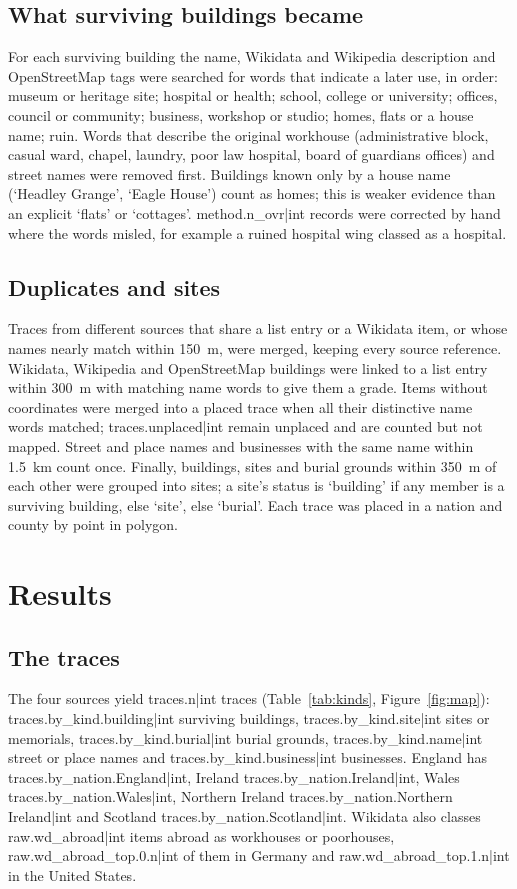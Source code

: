 \documentclass[11pt,a4paper]{article}
\begin{document}
\subsection{What surviving buildings became}
For each surviving building the name, Wikidata and Wikipedia description and OpenStreetMap tags were searched for words that indicate a later use, in order: museum or heritage site; hospital or health; school, college or university; offices, council or community; business, workshop or studio; homes, flats or a house name; ruin. Words that describe the original workhouse (administrative block, casual ward, chapel, laundry, poor law hospital, board of guardians offices) and street names were removed first. Buildings known only by a house name (`Headley Grange', `Eagle House') count as homes; this is weaker evidence than an explicit `flats' or `cottages'. {{method.n_ovr|int}} records were corrected by hand where the words misled, for example a ruined hospital wing classed as a hospital.

\subsection{Duplicates and sites}
Traces from different sources that share a list entry or a Wikidata item, or whose names nearly match within 150~m, were merged, keeping every source reference. Wikidata, Wikipedia and OpenStreetMap buildings were linked to a list entry within 300~m with matching name words to give them a grade. Items without coordinates were merged into a placed trace when all their distinctive name words matched; {{traces.unplaced|int}} remain unplaced and are counted but not mapped. Street and place names and businesses with the same name within 1.5~km count once. Finally, buildings, sites and burial grounds within 350~m of each other were grouped into sites; a site's status is `building' if any member is a surviving building, else `site', else `burial'. Each trace was placed in a nation and county by point in polygon.

\section{Results}
\subsection{The traces}
The four sources yield {{traces.n|int}} traces (Table~\ref{tab:kinds}, Figure~\ref{fig:map}): {{traces.by_kind.building|int}} surviving buildings, {{traces.by_kind.site|int}} sites or memorials, {{traces.by_kind.burial|int}} burial grounds, {{traces.by_kind.name|int}} street or place names and {{traces.by_kind.business|int}} businesses. England has {{traces.by_nation.England|int}}, Ireland {{traces.by_nation.Ireland|int}}, Wales {{traces.by_nation.Wales|int}}, Northern Ireland {{traces.by_nation.Northern Ireland|int}} and Scotland {{traces.by_nation.Scotland|int}}. Wikidata also classes {{raw.wd_abroad|int}} items abroad as workhouses or poorhouses, {{raw.wd_abroad_top.0.n|int}} of them in Germany and {{raw.wd_abroad_top.1.n|int}} in the United States.
\end{document}
